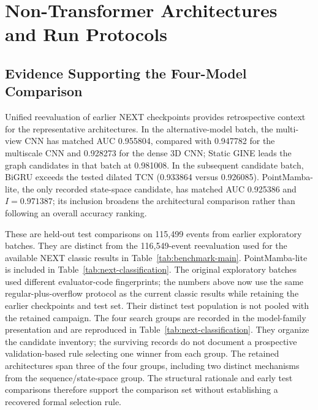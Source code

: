     \section{Non-Transformer Architectures and Run Protocols}
\label{app:wing-models}

\subsection{Evidence Supporting the Four-Model Comparison}
\label{app:selection-rationale}

Unified reevaluation of earlier NEXT checkpoints provides retrospective
context for the representative architectures. In the alternative-model batch, the multi-view CNN
has matched AUC 0.955804, compared with 0.947782 for the multiscale CNN and
0.928273 for the dense 3D CNN; Static GINE leads the graph candidates in that
batch at 0.981008. In the subsequent candidate batch, BiGRU exceeds the
tested dilated TCN (0.933864 versus 0.926085). PointMamba-lite, the only recorded
state-space candidate, has matched AUC 0.925386 and $I=0.971387$; its inclusion broadens the
architectural comparison rather than following an overall accuracy ranking.

These are held-out test comparisons on 115,499 events from earlier
exploratory batches. They are distinct from the 116,549-event reevaluation
used for the available NEXT classic results in Table~\ref{tab:benchmark-main}.
PointMamba-lite is included in
Table~\ref{tab:next-classification}. The original exploratory batches used different evaluator-code fingerprints;
the numbers above now use the same regular-plus-overflow protocol as the
current classic results while retaining the earlier checkpoints and test set.
Their distinct test population is not pooled with the retained campaign. The four search groups are recorded in the model-family
presentation and are reproduced in Table~\ref{tab:next-classification}.
They organize the candidate inventory; the surviving records do not
document a prospective validation-based rule selecting one winner from
each group. The retained architectures span three of the four groups,
including two distinct mechanisms from the sequence/state-space group.
The structural rationale and early test comparisons therefore support the
comparison set without establishing a recovered formal selection rule.



